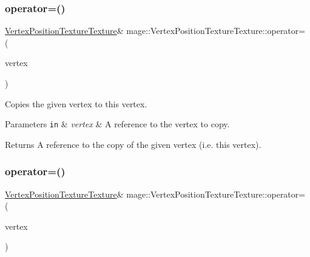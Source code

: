 \subsubsection{\texorpdfstring{operator=()}{operator=()}\hspace{0.1cm}{\footnotesize\ttfamily [1/2]}}
{\footnotesize\ttfamily \hyperlink{structmage_1_1_vertex_position_texture_texture}{Vertex\+Position\+Texture\+Texture}\& mage\+::\+Vertex\+Position\+Texture\+Texture\+::operator= (\begin{DoxyParamCaption}\item[{const \hyperlink{structmage_1_1_vertex_position_texture_texture}{Vertex\+Position\+Texture\+Texture} \&}]{vertex }\end{DoxyParamCaption})\hspace{0.3cm}{\ttfamily [default]}}

Copies the given vertex to this vertex.


\begin{DoxyParams}[1]{Parameters}
\mbox{\tt in}  & {\em vertex} & A reference to the vertex to copy. \\
\hline
\end{DoxyParams}
\begin{DoxyReturn}{Returns}
A reference to the copy of the given vertex (i.\+e. this vertex). 
\end{DoxyReturn}
\hypertarget{structmage_1_1_vertex_position_texture_texture_a4e6539fcab28def222ec66a3162b8cd9}{}\label{structmage_1_1_vertex_position_texture_texture_a4e6539fcab28def222ec66a3162b8cd9} 
\subsubsection{\texorpdfstring{operator=()}{operator=()}\hspace{0.1cm}{\footnotesize\ttfamily [2/2]}}
{\footnotesize\ttfamily \hyperlink{structmage_1_1_vertex_position_texture_texture}{Vertex\+Position\+Texture\+Texture}\& mage\+::\+Vertex\+Position\+Texture\+Texture\+::operator= (\begin{DoxyParamCaption}\item[{\hyperlink{structmage_1_1_vertex_position_texture_texture}{Vertex\+Position\+Texture\+Texture} \&\&}]{vertex }\end{DoxyParamCaption})\hspace{0.3cm}{\ttfamily [default]}}

